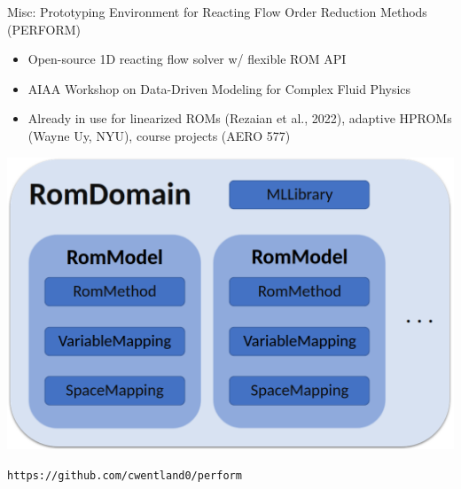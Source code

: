 \documentclass[]{beamer}
\begin{document}
\begin{frame}{\footnotesize{Misc: Prototyping Environment for Reacting Flow Order Reduction Methods (PERFORM)\footnotemark[14]}}
	\begin{itemize}
		\small
		\item Open-source 1D reacting flow solver w/ flexible ROM API
		\item AIAA Workshop on Data-Driven Modeling for Complex Fluid Physics
		\item Already in use for linearized ROMs (Rezaian et al., 2022), adaptive HPROMs (Wayne Uy, NYU), course projects (AERO 577)
		\normalsize
	\end{itemize}
	\vspace{0.5em}
	\begin{minipage}{0.4\linewidth}
		\includegraphics[width=0.99\linewidth]{misc/performAPI.png}
	\end{minipage}
	\begin{minipage}{0.59\linewidth}
	\end{minipage}

	\vspace{1em}
	\centering
	\texttt{https://github.com/cwentland0/perform}
\end{frame}
\end{document}
